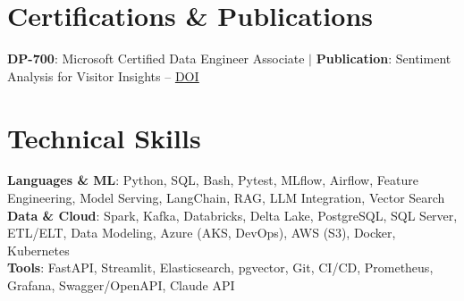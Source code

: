 \documentclass[letterpaper,11pt]{article}
\begin{document}
\section{Certifications \& Publications}
 \begin{itemize}[leftmargin=0.15in, label={}]
    \small{\item{
     \textbf{DP-700}{: Microsoft Certified Data Engineer Associate $|$} \textbf{Publication}{: Sentiment Analysis for Visitor Insights -- \href{https://doi.org/10.1080/10495142.2025.2525123}{\underline{DOI}}}
    }}
 \end{itemize}


\section{Technical Skills}
 \begin{itemize}[leftmargin=0.15in, label={}]
    \small{\item{
     \textbf{Languages \& ML}{: Python, SQL, Bash, Pytest, MLflow, Airflow, Feature Engineering, Model Serving, LangChain, RAG, LLM Integration, Vector Search} \\
     \textbf{Data \& Cloud}{: Spark, Kafka, Databricks, Delta Lake, PostgreSQL, SQL Server, ETL/ELT, Data Modeling, Azure (AKS, DevOps), AWS (S3), Docker, Kubernetes} \\
     \textbf{Tools}{: FastAPI, Streamlit, Elasticsearch, pgvector, Git, CI/CD, Prometheus, Grafana, Swagger/OpenAPI, Claude API} \\
    }}
 \end{itemize}

\end{document}
